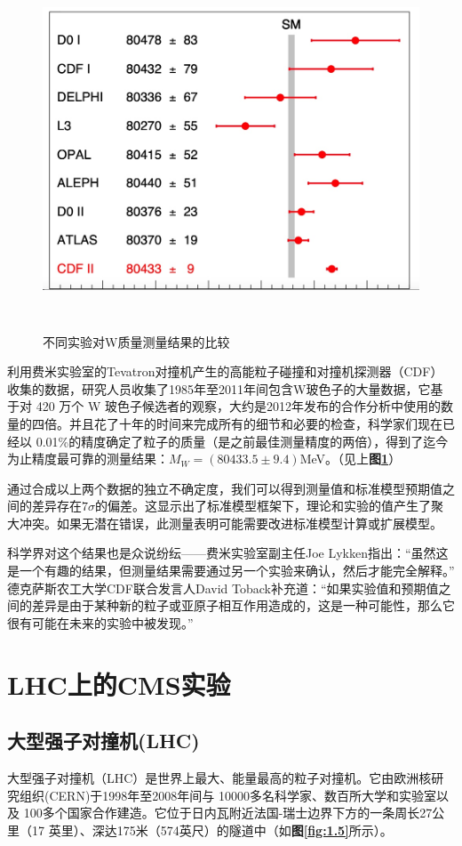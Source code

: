 \begin{figure}[H]
 \centering
 \caption{不同实验对W质量测量结果的比较\cite{Wmass_fig}}
 \includegraphics[height=10cm, width=12cm]{pictures/w-boson-comparisons.jpeg}
 \label{fig:1.4}
\end{figure}

利用费米实验室的Tevatron对撞机产生的高能粒子碰撞和对撞机探测器（CDF）收集的数据，研究人员收集了1985年至2011年间包含W玻色子的大量数据，它基于对 420 万个 W 玻色子候选者的观察，大约是2012年发布的合作分析中使用的数量的四倍。并且花了十年的时间来完成所有的细节和必要的检查，科学家们现在已经以 0.01\%的精度确定了粒子的质量（是之前最佳测量精度的两倍），得到了迄今为止精度最可靠的测量结果：$M_W=(80433.5\pm9.4)$MeV。（见上\textbf{图\ref{fig:1.4}}）

通过合成以上两个数据的独立不确定度，我们可以得到测量值和标准模型预期值之间的差异存在$7\sigma$的偏差。这显示出了标准模型框架下，理论和实验的值产生了聚大冲突。如果无潜在错误，此测量表明可能需要改进标准模型计算或扩展模型。

科学界对这个结果也是众说纷纭——费米实验室副主任Joe Lykken指出：“虽然这是一个有趣的结果，但测量结果需要通过另一个实验来确认，然后才能完全解释。” 德克萨斯农工大学CDF联合发言人David Toback补充道：“如果实验值和预期值之间的差异是由于某种新的粒子或亚原子相互作用造成的，这是一种可能性，那么它很有可能在未来的实验中被发现。”

\section{LHC上的CMS实验}
\subsection{大型强子对撞机(LHC)}
大型强子对撞机（LHC）是世界上最大、能量最高的粒子对撞机。它由欧洲核研究组织(CERN)于1998年至2008年间与 10000多名科学家、数百所大学和实验室以及 100多个国家合作建造。它位于日内瓦附近法国-瑞士边界下方的一条周长27公里（17 英里）、深达175米（574英尺）的隧道中（如\textbf{图\ref{fig:1.5}}所示）。


